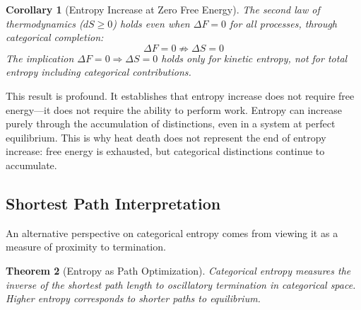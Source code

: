 \documentclass[12pt,a4paper]{article}
\newtheorem{theorem}{Theorem}[section]
\newtheorem{corollary}[theorem]{Corollary}
\theoremstyle{definition}
\theoremstyle{remark}
\begin{document}
\begin{corollary}[Entropy Increase at Zero Free Energy]
\label{cor:entropy_at_zero_free_energy}
The second law of thermodynamics ($dS \geq 0$) holds even when $\Delta F = 0$ for all processes, through categorical completion:
\begin{equation}
\Delta F = 0 \not\Rightarrow \Delta S = 0
\end{equation}
The implication $\Delta F = 0 \Rightarrow \Delta S = 0$ holds only for kinetic entropy, not for total entropy including categorical contributions.
\end{corollary}

This result is profound. It establishes that entropy increase does not require free energy—it does not require the ability to perform work. Entropy can increase purely through the accumulation of distinctions, even in a system at perfect equilibrium. This is why heat death does not represent the end of entropy increase: free energy is exhausted, but categorical distinctions continue to accumulate.

\subsection{Shortest Path Interpretation}

An alternative perspective on categorical entropy comes from viewing it as a measure of proximity to termination.

\begin{theorem}[Entropy as Path Optimization]
\label{thm:shortest_path}
Categorical entropy measures the inverse of the shortest path length to oscillatory termination in categorical space. Higher entropy corresponds to shorter paths to equilibrium.
\end{theorem}
\end{document}
